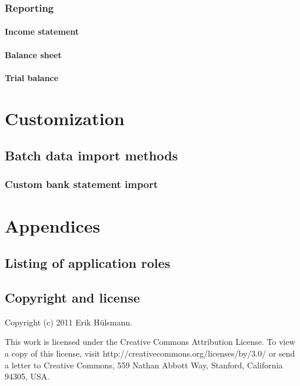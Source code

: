\documentclass[10pt,A4]{book}
\begin{document}
\section{Reporting}
\subsection{Income statement}
\subsection{Balance sheet}
\subsection{Trial balance}



\part{Customization}
\label{part:Customization}

\chapter{Batch data import methods}

\section{Custom bank statement import}



\part{Appendices}
\appendix

\chapter{Listing of application roles}

\chapter{Copyright and license}

Copyright (c) 2011 Erik H\"ulsmann.


This work is licensed under the Creative Commons Attribution License.
To view a copy of this license, visit http://creativecommons.org/licenses/by/3.0/
or send a letter to Creative Commons, 559 Nathan Abbott Way,
Stanford, California 94305, USA.
\end{document}

